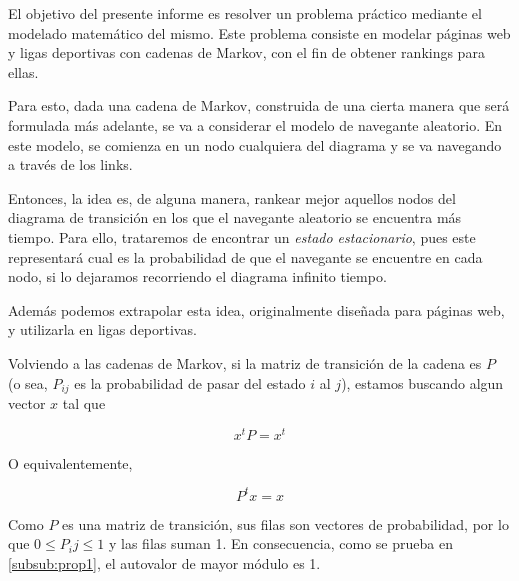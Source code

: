 
El objetivo del presente informe es resolver un problema práctico mediante el modelado matemático del mismo. Este problema consiste en modelar páginas web y ligas deportivas con cadenas de Markov, con el fin de obtener rankings para ellas.


Para esto, dada una cadena de Markov, construida de una cierta manera que será formulada más adelante, se va a considerar el modelo de navegante aleatorio. En este modelo, se comienza en un nodo cualquiera del diagrama y se va navegando a trav\'es de los links.

Entonces, la idea es, de alguna manera, rankear mejor aquellos nodos del diagrama de transición en los que el navegante aleatorio se encuentra más tiempo. Para ello, trataremos de encontrar un \emph{estado estacionario}, pues este representará cual es la probabilidad de que el navegante se encuentre en cada nodo, si lo dejaramos recorriendo el diagrama infinito tiempo.

Además podemos extrapolar esta idea, originalmente diseñada para páginas web, y utilizarla en ligas deportivas.

Volviendo a las cadenas de Markov, si la matriz de transición de la cadena es $P$ (o sea, $P_{ij}$ es la probabilidad de pasar del estado $i$ al $j$), estamos buscando algun vector $x$ tal que

\[ x^t P = x^t \]

O equivalentemente,

\[P^t x = x\]

Como $P$ es una matriz de transición, sus filas son vectores de probabilidad, por lo que $0 \leq P_ij \leq 1$ y las filas suman 1. En consecuencia, como se prueba en \ref{subsub:prop1}, el autovalor de mayor módulo es 1.


